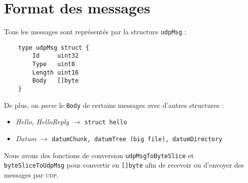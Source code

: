\section{Format des messages}
Tous les messages sont représentés par la structure \texttt{udpMsg} :
\begin{verbatim}
    type udpMsg struct {
        Id     uint32
        Type   uint8
        Length uint16
        Body   []byte
    }  
\end{verbatim}
De plus, on \textit{parse} le \texttt{Body} de certains messages avec d'autres structures :
\begin{itemize}
    \item \textit{Hello, HelloReply} $\rightarrow$ \texttt{struct hello}
    \item \textit{Datum} $\rightarrow$ \texttt{datumChunk, datumTree (big file), datumDirectory}
\end{itemize}
Nous avons des fonctions de conversion \texttt{udpMsgToByteSlice} et \texttt{byteSliceToUdpMsg} pour convertir en \texttt{[]byte} afin de recevoir ou d'envoyer des messages par \textsc{udp}.


